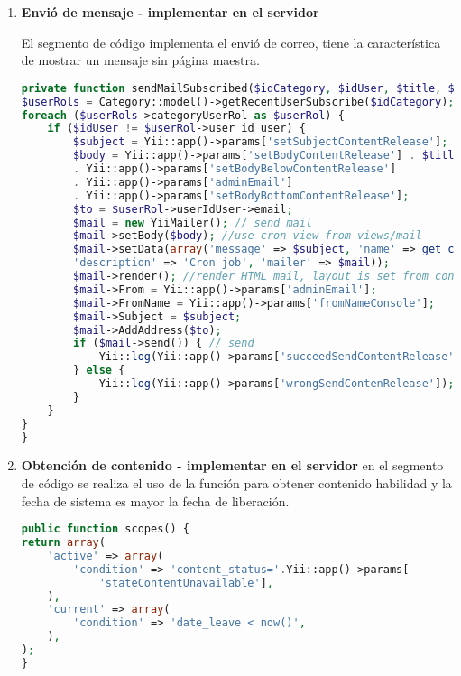 \begin{itemize}
\begin{itemize}
\end{itemize}

\begin{enumerate}

\item \textbf{Envió de mensaje - implementar en el servidor}

El segmento de código implementa el envió de correo, tiene la característica
de mostrar un mensaje sin página maestra.

\begin{lstlisting}[language=PHP, caption={Envió de mensaje sin  contenedor de página.}]
private function sendMailSubscribed($idCategory, $idUser, $title, $summary) {
$userRols = Category::model()->getRecentUserSubscribe($idCategory);
foreach ($userRols->categoryUserRol as $userRol) {
    if ($idUser != $userRol->user_id_user) {
        $subject = Yii::app()->params['setSubjectContentRelease'];
        $body = Yii::app()->params['setBodyContentRelease'] . $title . $summary
        . Yii::app()->params['setBodyBelowContentRelease'] 
        . Yii::app()->params['adminEmail']
        . Yii::app()->params['setBodyBottomContentRelease'];
        $to = $userRol->userIdUser->email;
        $mail = new YiiMailer(); // send mail
        $mail->setBody($body); //use cron view from views/mail
        $mail->setData(array('message' => $subject, 'name' => get_class($this), 
        'description' => 'Cron job', 'mailer' => $mail));
        $mail->render(); //render HTML mail, layout is set from config file
        $mail->From = Yii::app()->params['adminEmail'];
        $mail->FromName = Yii::app()->params['fromNameConsole'];
        $mail->Subject = $subject;
        $mail->AddAddress($to);
        if ($mail->send()) { // send
            Yii::log(Yii::app()->params['succeedSendContentRelease']); 
        } else {
            Yii::log(Yii::app()->params['wrongSendContenRelease']);
        }
    }
}
}
\end{lstlisting}

\item \textbf{Obtención de contenido - implementar en el servidor}
en el segmento de código se realiza el uso de la función 
para obtener contenido habilidad y la fecha de sistema es mayor la fecha
de liberación.

\begin{lstlisting}[language=PHP, caption={Obtención de contenido para liberar podcast.}]
public function scopes() {
return array(
    'active' => array(
        'condition' => 'content_status='.Yii::app()->params[
            'stateContentUnavailable'],
    ),
    'current' => array(
        'condition' => 'date_leave < now()',
    ),
);
}
\end{lstlisting}

\end{enumerate}

\end{itemize}

